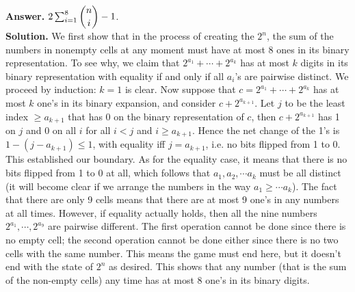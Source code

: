 \documentclass[11pt,a4paper]{article}
\begin{document}
\begin{enumerate}
	\textbf{Answer.} $2\sum_{i=1}^8\dbinom{n}{i} - 1$. \\
	\textbf{Solution.} We first show that in the process of creating the $2^n$, the sum of the numbers in nonempty cells at any moment must have at most 8 ones in its binary representation. To see why, we claim that $2^{a_1}+\cdots + 2^{a_k}$ has at most $k$ digits in its binary representation with equality if and only if all $a_i$'s are pairwise distinct. We proceed by induction: $k=1$ is clear. Now suppose that $c=2^{a_1}+\cdots + 2^{a_k}$ has at most $k$ one's in its binary expansion, and consider $c+2^{a_{k+1}}$. Let $j$ to be the least index $\ge a_{k+1}$ that has 0 on the binary representation of $c$, then $c+2^{a_{k+1}}$ has 1 on $j$ and 0 on all $i$ for all $i < j$ and $i \ge a_{k+1}$. Hence the net change of the 1's is $1 - (j - a_{k+1})\le 1$, with equality iff $j=a_{k+1}$, i.e. no bits flipped from 1 to 0. This established our boundary. As for the equality case, it means that there is no bits flipped from 1 to 0 at all, which follows that $a_1, a_2, \cdots a_k$ must be all distinct (it will become clear if we arrange the numbers in the way $a_1\ge\cdots a_k$). The fact that there are only 9 cells means that there are at most 9 one's in any numbers at all times. However, if equality actually holds, then all the nine numbers $2^{a_1}, \cdots , 2^{a_9}$ are pairwise different. The first operation cannot be done since there is no empty cell; the second operation cannot be done either since there is no two cells with the same number. This means the game must end here, but it doesn't end with the state of $2^n$ as desired. This shows that any number (that is the sum of the non-empty cells) any time has at most 8 one's in its binary digits. 
	

\end{enumerate}
\end{document}
